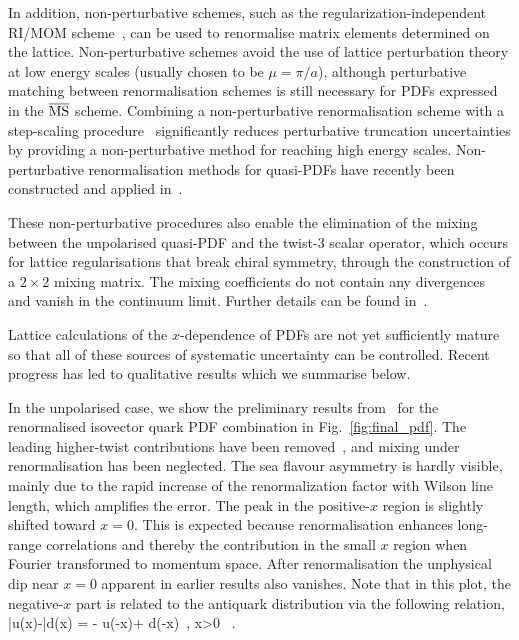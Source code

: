\begin{itemize}
In addition, non-perturbative schemes, such as the regularization-independent 
RI/MOM scheme~\cite{Martinelli:1994ty}, can be used to renormalise matrix 
elements determined on the lattice. 
%
Non-perturbative schemes avoid the use of lattice perturbation theory at low 
energy scales (usually chosen to be $\mu = \pi/a$), although perturbative 
matching between renormalisation schemes is still necessary for PDFs expressed 
in the $\overline{\rm MS}$ scheme. 
%
Combining a non-perturbative renormalisation scheme with a step-scaling 
procedure~\cite{Luscher:1991wu} significantly reduces perturbative truncation 
uncertainties by providing a non-perturbative method for reaching high energy 
scales. 
%
Non-perturbative renormalisation methods for quasi-PDFs have recently been 
constructed and applied in~\cite{Alexandrou:2017huk,Chen:2017mzz}.

These non-perturbative procedures also enable the elimination of the mixing 
between the unpolarised quasi-PDF and the twist-3 scalar operator, 
which occurs for lattice regularisations that break chiral symmetry, 
through the construction of a $2\times2$ mixing matrix. 
%
The mixing coefficients do not contain any divergences and vanish in the 
continuum limit. 
%
Further details can be found in~\cite{Alexandrou:2017huk,Chen:2017mzz}. 
\end{itemize}

Lattice calculations of the $x$-dependence of PDFs are not yet sufficiently 
mature so that all of these sources of systematic uncertainty can be 
controlled. 
%
Recent progress has led to qualitative results which we 
summarise below.

In the unpolarised case, we show the preliminary results 
from~\cite{Chen:2017mzz} for the renormalised isovector quark PDF combination 
in Fig.~\ref{fig:final_pdf}. 
%
The leading higher-twist contributions have been removed~\cite{Chen:2016utp}, 
and mixing under renormalisation has been neglected. 
%
The sea flavour asymmetry is hardly visible, mainly due to the rapid increase 
of the renormalization factor with Wilson line length, which amplifies the 
error.
%
The peak in the positive-$x$ region is slightly shifted toward $x{=}0$. 
%
This is expected because renormalisation enhances long-range correlations and
thereby the contribution in the small $x$ region when Fourier transformed to 
momentum space. 
%
After renormalisation the unphysical dip near $x=0$ apparent in earlier 
results also vanishes.
%
Note that in this plot, the negative-$x$ part is related to the antiquark 
distribution via the following relation,
\be
\bar{u}(x)-\bar{d}(x) = - u(-x)+ d(-x)\, , \quad x>0 \, .
\ee

